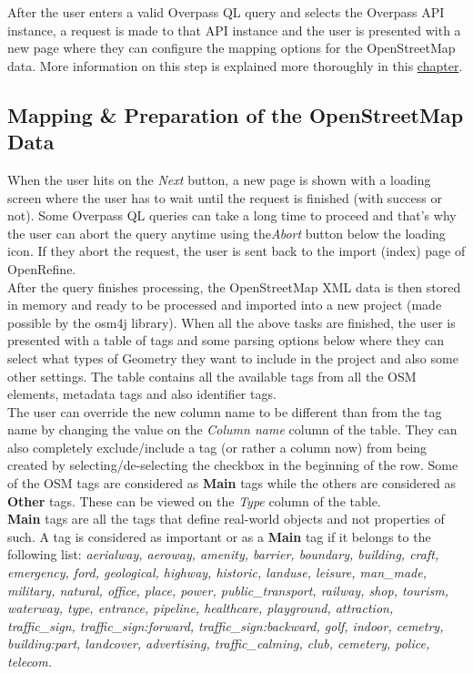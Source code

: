 After the user enters a valid Overpass QL query and selects the Overpass API instance, a request is made to that API instance and
the user is presented with a new page where they can configure the mapping options for the OpenStreetMap data. More information on
this step is explained more thoroughly in this
\hyperref[sec:mapping-preparation-of-openstreetmap-data]{chapter}.
\subsection{Mapping \& Preparation of the OpenStreetMap Data}\label{sec:mapping-preparation-of-openstreetmap-data}
When the user hits on the \textit{Next} button, a new page is shown with a loading screen where the user has to wait until
the request is finished (with success or not). Some Overpass QL queries can take a long time to proceed and that's why
the user can abort the query anytime using the\textit{Abort} button below the loading icon. If they abort the request,
the user is sent back to the import (index) page of OpenRefine.\\
\newline
After the query finishes processing, the OpenStreetMap XML data is then stored in memory and ready to be processed and
imported into a new project (made possible by the osm4j library).
\newline
When all the above tasks are finished, the user is presented with a table of tags and some parsing options below where they
can select what types of Geometry they want to include in the project and also some other settings. The table contains
all the available tags from all the OSM elements, metadata tags and also identifier tags. \\
\newline
The user can override the new column name to be different than from the tag name by changing the value on the
\textit{Column name} column of the table. They can also completely exclude/include a tag (or rather a column now) from being created
by selecting/de-selecting the checkbox in the beginning of the row. Some of the OSM tags are considered as \textbf{Main}
tags while the others are considered as \textbf{Other} tags. These can be viewed on the \textit{Type} column of the table.\\
\newline
\textbf{Main} tags are all the tags that define real-world objects and not properties of such.
A tag is considered as important or as a \textbf{Main} tag if it belongs to the following list:
\textit{aerialway, aeroway, amenity, barrier, boundary, building, craft, emergency, ford, geological, highway, historic,
landuse, leisure, man\_made, military, natural,
office, place, power, public\_transport, railway, shop, tourism, waterway, type, entrance, pipeline, healthcare,
playground, attraction, traffic\_sign, traffic\_sign:forward, traffic\_sign:backward, golf, indoor, cemetry, building:part,
landcover, advertising, traffic\_calming, club, cemetery, police, telecom.}\\

